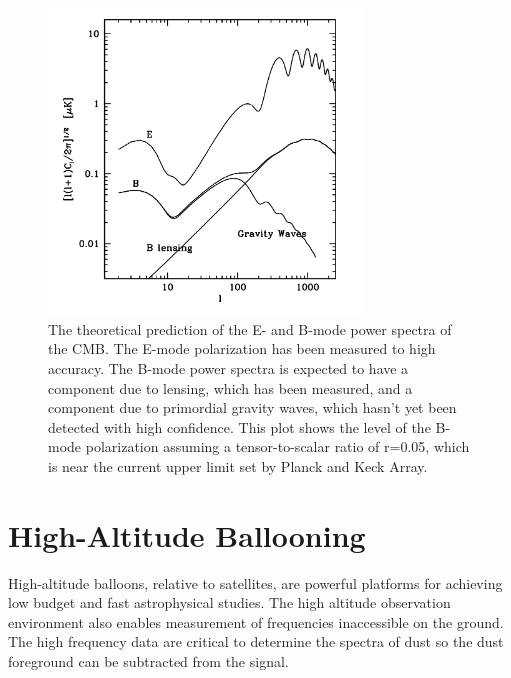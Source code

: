 \begin{figure}[htbp]
\begin{center}
\includegraphics[height=3.2in]{figures/predicted_power_spectra.png}
\caption[CMB power spectra]{The theoretical prediction of the E- and B-mode power spectra of the \ac{CMB}. The E-mode polarization has been measured to high accuracy. The B-mode power spectra is expected to have a component due to lensing, which has been measured, and a component due to primordial gravity waves, which hasn't yet been detected with high confidence. This plot shows the level of the B-mode polarization assuming a tensor-to-scalar ratio of r=0.05, which is near the current upper limit set by Planck and Keck Array. 
\label{fig:cmb_spectra} }
\end{center}
\end{figure}




\section{High-Altitude Ballooning}
\label{sec:balloons}


High-altitude balloons, relative to satellites, are powerful platforms for achieving low budget and fast astrophysical studies. 
The high altitude observation environment also enables measurement of frequencies inaccessible on the ground. 
The high frequency data are critical to determine the spectra of dust so the dust foreground can be subtracted from the signal. 

